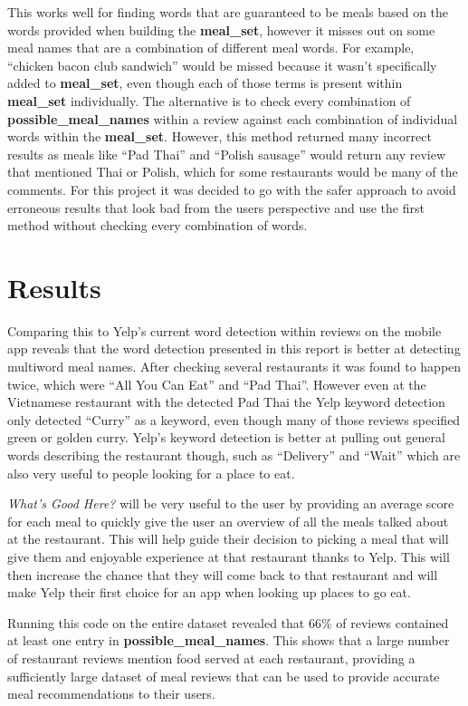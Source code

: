 \documentclass[12pt, openany]{scrbook}
\begin{document}
This works well for finding words that are guaranteed to be meals based
on the words provided when building the \textbf{meal\_set}, however it misses out
on some meal names that are a combination of different meal words.
For example, ``chicken bacon club sandwich'' would be missed
because it wasn't specifically added to \textbf{meal\_set}, even though
each of those terms is present within \textbf{meal\_set} individually.
The alternative is to check every combination of \textbf{possible\_meal\_names}
within a review against each combination of individual words within the \textbf{meal\_set}.  
However, this method returned many incorrect results as meals like ``Pad Thai'' and 
``Polish sausage'' would return any review that mentioned Thai or Polish,
which for some restaurants would be many of the comments.
For this project it was decided to go with the safer approach to avoid
erroneous results that look bad from the users perspective
and use the first method without checking every combination of words.

\chapter{Results}

Comparing this to Yelp's current word detection within reviews on the mobile app
reveals that the word detection presented in this report is better at
detecting multiword meal names.
After checking several restaurants it was found to happen twice, which were
``All You Can Eat'' and ``Pad Thai''.
However even at the Vietnamese restaurant with the detected Pad Thai the Yelp
keyword detection only detected ``Curry'' as a keyword, even though
many of those reviews specified green or golden curry.
Yelp's keyword detection is better at pulling out general words
describing the restaurant though, such as ``Delivery'' and ``Wait''
which are also very useful to people looking for a place to eat.

\emph{What's Good Here?} will be very useful to the user by providing an 
average score for each meal to quickly give the user an overview of all
the meals talked about at the restaurant.
This will help guide their decision to picking a meal that will give them
and enjoyable experience at that restaurant thanks to Yelp.
This will then increase the chance that they will come back to that restaurant
and will make Yelp their first choice for an app when looking up places to go eat.

Running this code on the entire dataset revealed that 66\% of reviews
contained at least one entry in \textbf{possible\_meal\_names}.
This shows that a large number of restaurant reviews mention food
served at each restaurant, providing a sufficiently large dataset
of meal reviews that can be used to provide accurate
meal recommendations to their users.
\end{document}
